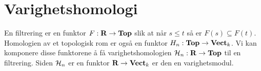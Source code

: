 \section{Varighetshomologi}
En filtrering er en funktor $F:\textnormal{\textbf{R}}\to\textnormal{\textbf{Top}}$ slik at når $s\leq t$ så er $F(s)\subseteq F(t)$. Homologien av et topologisk rom er også en funktor $H_n:\textnormal{\textbf{Top}}\to \textnormal{\textbf{Vect}}_k$. Vi kan komponere disse funktorene å få varighetshomologien $\mathcal{H}_n:\textnormal{\textbf{R}}\to\textnormal{\textbf{Top}}$ til en filtrering. Siden $\mathcal{H}_n$ er en funktor $\textnormal{\textbf{R}}\to\textnormal{\textbf{Vect}}_k$ er den en varighetsmodul.